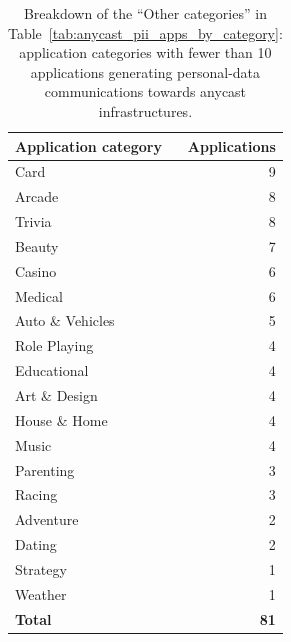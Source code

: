\documentclass[
A4paper,                %
twoside,                %
openright,              %
chapterprefix=true,     %
12pt,                   %
headings=normal,        %
titlepage=on            %
]{book}
\begin{document}
\begin{table}[ht]
    \centering
    \small
    \caption{Breakdown of the ``Other categories'' in Table~\ref{tab:anycast_pii_apps_by_category}: application categories with fewer than 10 applications generating personal-data communications towards anycast infrastructures.}
    \label{tab:anycast_pii_apps_by_category_less_ten_repetitions}
    \begin{tabular}{lr}
        \toprule
        \textbf{Application category} & \textbf{Applications} \\
        \midrule
        Card & 9 \\
        Arcade & 8 \\
        Trivia & 8 \\
        Beauty & 7 \\
        Casino & 6 \\
        Medical & 6 \\
        Auto \& Vehicles & 5 \\
        Role Playing & 4 \\
        Educational & 4 \\
        Art \& Design & 4 \\
        House \& Home & 4 \\
        Music & 4 \\
        Parenting & 3 \\
        Racing & 3 \\
        Adventure & 2 \\
        Dating & 2 \\
        Strategy & 1 \\
        Weather & 1 \\
        \midrule
        \textbf{Total} & \textbf{81} \\
        \bottomrule
    \end{tabular}
\end{table}
\end{document}

